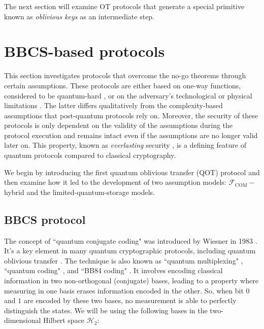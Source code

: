 The next section will examine OT protocols that generate a special primitive known as \textit{oblivious keys} as an intermediate step.



\section{BBCS-based protocols}

This section investigates protocols that overcome the no-go theorems \cite{LC97, M97} through certain assumptions. These protocols are either based on one-way functions, considered to be quantum-hard \cite{BCKM21, GLSV21, A02}, or on the adversary's technological or physical limitations \cite{DFSS05, WST08, KWW12, L14, Pit16, Ken11}. The latter differs qualitatively from the complexity-based assumptions that post-quantum protocols rely on. Moreover, the security of these protocols is only dependent on the validity of the assumptions during the protocol execution and remains intact even if the assumptions are no longer valid later on. This property, known as \textit{everlasting} security \cite{U18}, is a defining feature of quantum protocols compared to classical cryptography.

We begin by introducing the first quantum oblivious transfer (QOT) protocol and then examine how it led to the development of two assumption models: $\mathcal{F}_{\text{COM}}-$hybrid and the limited-quantum-storage models.

\subsection{BBCS protocol}\label{sec:BBCS}

The concept of ``quantum conjugate coding" was introduced by Wiesner in 1983 \cite{W83}. It's a key element in many quantum cryptographic protocols, including quantum oblivious transfer \cite{BBCS92}. The technique is also known as ``quantum multiplexing" \cite{BBBW83}, ``quantum coding" \cite{BBB14}, and ``BB84 coding" \cite{S99}. It involves encoding classical information in two non-orthogonal (conjugate) bases, leading to a property where measuring in one basis erases information encoded in the other. So, when bit $0$ and $1$ are encoded by these two bases, no measurement is able to perfectly distinguish the states. We will be using the following bases in the two-dimensional Hilbert space $\mathcal{H}_2$:

